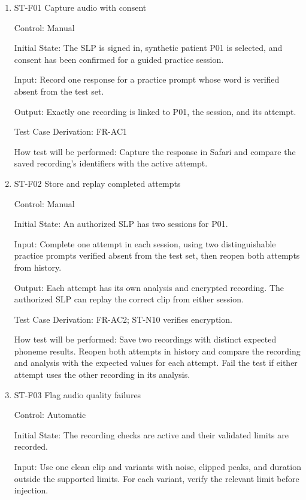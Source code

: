 \documentclass[12pt, titlepage]{article}
\begin{document}
\begin{enumerate}

\item{ST-F01 Capture audio with consent\\}

Control: Manual

Initial State: The SLP is signed in, synthetic patient P01 is selected, and consent has been confirmed for a guided practice session.

Input: Record one response for a practice prompt whose word is verified absent from the test set.

Output: Exactly one recording is linked to P01, the session, and its attempt.

Test Case Derivation: FR-AC1

How test will be performed: Capture the response in Safari and compare the saved recording's identifiers with the active attempt.

\item{ST-F02 Store and replay completed attempts\\}

Control: Manual

Initial State: An authorized SLP has two sessions for P01.

Input: Complete one attempt in each session, using two distinguishable practice prompts verified absent from the test set, then reopen both attempts from history.

Output: Each attempt has its own analysis and encrypted recording. The authorized SLP can replay the correct clip from either session.

Test Case Derivation: FR-AC2; ST-N10 verifies encryption.

How test will be performed: Save two recordings with distinct expected phoneme results. Reopen both attempts in history and compare the recording and analysis with the expected values for each attempt. Fail the test if either attempt uses the other recording in its analysis.

\item{ST-F03 Flag audio quality failures\\}

Control: Automatic

Initial State: The recording checks are active and their validated limits are recorded.

Input: Use one clean clip and variants with noise, clipped peaks, and duration outside the supported limits. For each variant, verify the relevant limit before injection.


\end{enumerate}
\end{document}
